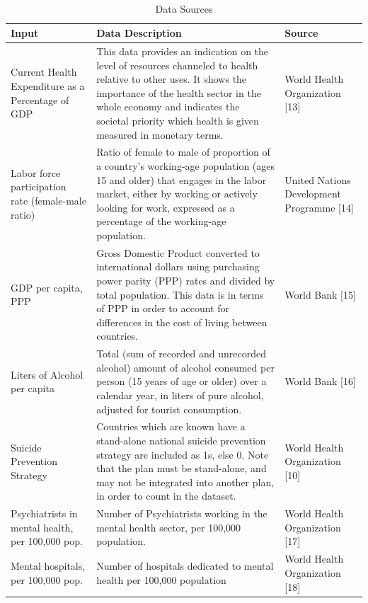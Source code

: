\documentclass[]{article}
\begin{document}
\begin{table}[H]
\centering 
\caption{Data Sources}
\
\begin{tabular}{p{3cm}p{7cm}p{5cm}}  
\hline  
  Input & Data Description  & Source  \\   
\hline 
Current Health Expenditure as a Percentage of GDP & This data provides an indication on the level of resources channeled to health relative to other uses. It shows the importance of the health sector in the whole economy and indicates the societal priority which health is given measured in monetary terms. & World Health Organization [13]  \\   
 \hline 
Labor force participation rate (female-male ratio) & Ratio of female to male of proportion of a country’s working-age population (ages 15 and older) that engages in the labor market, either by working or actively looking for work, expressed as a percentage of the working-age population. & United Nations Development Programme [14] \\   
\hline 
GDP per capita, PPP & Gross Domestic Product converted to international dollars using purchasing power parity (PPP) rates and divided by total population. This data is in terms of PPP in order to account for differences in the cost of living between countries. & World Bank [15] \\
\hline 
Liters of Alcohol per capita &  Total (sum of recorded and unrecorded alcohol) amount of alcohol consumed per person (15 years of age or older) over a calendar year, in liters of pure alcohol, adjusted for tourist consumption. & World Bank [16] \\
\hline 
Suicide Prevention Strategy &  Countries which are known have a stand-alone national suicide prevention strategy are included as 1s, else 0. Note that the plan must be stand-alone, and may not be integrated into another plan, in order to count in the dataset. & World Health Organization [10] \\
\hline
Psychiatrists in mental health, per 100,000 pop. & Number of Psychiatrists working in the mental health sector, per 100,000 population.  & World Health Organization [17]  \\
\hline
Mental hospitals, per 100,000 pop. & Number of hospitals dedicated to mental health per 100,000 population & World Health Organization [18] \\
\hline
\end{tabular} 
\end{table}

\newpage
\end{document}
